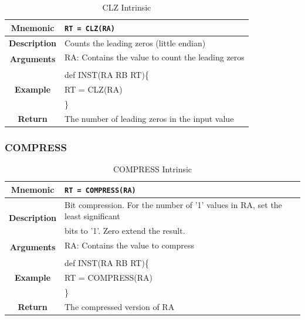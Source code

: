 \documentclass{article}
\begin{document}
\begin{table}[h]
\begin{center}
\caption{CLZ Intrinsic}
\vspace{0.125in}
\label{tab:CLZIntrinsic}
\begin{tabular}{|c|l|}
\hline
\textbf{Mnemonic} & \texttt{RT = CLZ(RA)}\\
\hline
\textbf{Description} & Counts the leading zeros (little endian)\\
\hline
\multirow{2}{*}{\textbf{Arguments}} & RA: Contains the value to count the leading zeros\\
                          			     & \\
\hline
\multirow{3}{*}{\textbf{Example}} & def INST(RA RB RT)\{\\
                          			  &   RT = CLZ(RA)\\
                                                    & \}\\
\hline
\textbf{Return} & The number of leading zeros in the input value\\                                                    
\hline
\end{tabular}
\end{center}
\end{table}

\clearpage
\subsubsection{COMPRESS}
\label{sec:COMPRESS}

\begin{table}[h]
\begin{center}
\caption{COMPRESS Intrinsic}
\vspace{0.125in}
\label{tab:COMPRESSIntrinsic}
\begin{tabular}{|c|l|}
\hline
\textbf{Mnemonic} & \texttt{RT = COMPRESS(RA)}\\
\hline
\multirow{2}{*}{\textbf{Description}} & Bit compression.  For the number of '1' values in RA, set the least significant \\
						      & bits to '1'.  Zero extend the result.\\
\hline
\multirow{2}{*}{\textbf{Arguments}} & RA: Contains the value to compress\\
                          			     & \\
\hline
\multirow{3}{*}{\textbf{Example}} & def INST(RA RB RT)\{\\
                          			  &   RT = COMPRESS(RA)\\
                                                    & \}\\
\hline
\textbf{Return} & The compressed version of RA\\                                                    
\hline
\end{tabular}
\end{center}
\end{table}
\end{document}
